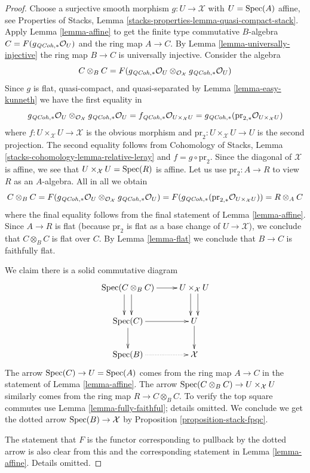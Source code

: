 \begin{proof}
Choose a surjective smooth morphism $g : U \to \mathcal{X}$ with $U = \mathop{\mathrm{Spec}}(A)$
affine, see Properties of Stacks, Lemma
\ref{stacks-properties-lemma-quasi-compact-stack}. Apply
Lemma \ref{lemma-affine} to get the finite type
commutative $B$-algebra $C = F(g_{\mathit{QCoh}, *}\mathcal{O}_U)$
and the ring map $A \to C$.
By Lemma \ref{lemma-universally-injective}
the ring map $B \to C$ is universally injective.
Consider the algebra
$$
C \otimes_B C =
F(g_{\mathit{QCoh}, *}\mathcal{O}_U
\otimes_{\mathcal{O}_\mathcal{X}}
g_{\mathit{QCoh}, *}\mathcal{O}_U)
$$
Since $g$ is flat, quasi-compact, and quasi-separated
by Lemma \ref{lemma-easy-kunneth} we have the first equality in
$$
g_{\mathit{QCoh}, *}\mathcal{O}_U
\otimes_{\mathcal{O}_\mathcal{X}}
g_{\mathit{QCoh}, *}\mathcal{O}_U
=
f_{\mathit{QCoh}, *}\mathcal{O}_{U \times_\mathcal{X} U} =
g_{\mathit{QCoh}, *}(\text{pr}_{2, *}\mathcal{O}_{U \times_\mathcal{X} U})
$$
where
$f : U \times_\mathcal{X} U \to \mathcal{X}$ is the obvious morphism
and $\text{pr}_2 : U \times_\mathcal{X} U \to U$ is the second
projection. The second equality follows from
Cohomology of Stacks, Lemma \ref{stacks-cohomology-lemma-relative-leray}
and $f = g \circ \text{pr}_2$. Since the diagonal of $\mathcal{X}$
is affine, we see that $U \times_\mathcal{X} U = \mathop{\mathrm{Spec}}(R)$ is affine.
Let us use $\text{pr}_2 : A \to R$ to view $R$ as an $A$-algebra.
All in all we obtain
$$
C \otimes_B C =
F(g_{\mathit{QCoh}, *}\mathcal{O}_U
\otimes_{\mathcal{O}_\mathcal{X}}
g_{\mathit{QCoh}, *}\mathcal{O}_U) =
F(g_{\mathit{QCoh}, *}(\text{pr}_{2, *}\mathcal{O}_{U \times_\mathcal{X} U})) =
R \otimes_A C
$$
where the final equality follows from the final statement of
Lemma \ref{lemma-affine}. Since $A \to R$ is flat (because
$\text{pr}_2$ is flat as a base change of $U \to \mathcal{X}$),
we conclude that $C \otimes_B C$ is flat over $C$.
By Lemma \ref{lemma-flat} we conclude that $B \to C$ is faithfully flat.

\medskip\noindent
We claim there is a solid commutative diagram
$$
\xymatrix{
\Spec(C \otimes_B C) \ar@<1ex>[d] \ar@<-1ex>[d] \ar[r] &
U \times_\mathcal{X} U \ar@<1ex>[d] \ar@<-1ex>[d] \\
\Spec(C) \ar[d] \ar[r] &
U \ar[d] \\
\Spec(B) \ar@{..>}[r] &
\mathcal{X}
}
$$
The arrow $\mathop{\mathrm{Spec}}(C) \to U = \mathop{\mathrm{Spec}}(A)$ comes from the ring map
$A \to C$ in the statement of Lemma \ref{lemma-affine}.
The arrow $\mathop{\mathrm{Spec}}(C \otimes_B C) \to U \times_\mathcal{X} U$
similarly comes from the ring map $R \to C \otimes_B C$.
To verify the top square commutes use Lemma \ref{lemma-fully-faithful};
details omitted.
We conclude we get the dotted arrow $\mathop{\mathrm{Spec}}(B) \to \mathcal{X}$
by Proposition \ref{proposition-stack-fpqc}.

\medskip\noindent
The statement that $F$ is the functor corresponding to pullback
by the dotted arrow is also clear from this and the corresponding
statement in Lemma \ref{lemma-affine}. Details omitted.
\end{proof}

